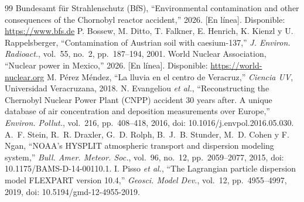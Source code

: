 \begin{thebibliography}{99}
 Bundesamt f\"ur Strahlenschutz (BfS), ``Environmental contamination and other consequences of the Chornobyl reactor accident,'' 2026. [En l\'inea]. Disponible: \url{https://www.bfs.de}
 P. Bossew, M. Ditto, T. Falkner, E. Henrich, K. Kienzl y U. Rappelsberger, ``Contamination of Austrian soil with caesium-137,'' \textit{J. Environ. Radioact.}, vol.~55, no.~2, pp.~187--194, 2001.
 World Nuclear Association, ``Nuclear power in Mexico,'' 2026. [En l\'inea]. Disponible: \url{https://world-nuclear.org}
 M. P\'erez M\'endez, ``La lluvia en el centro de Veracruz,'' \textit{Ciencia UV}, Universidad Veracruzana, 2018.
 N. Evangeliou \textit{et al.}, ``Reconstructing the Chernobyl Nuclear Power Plant (CNPP) accident 30 years after. A unique database of air concentration and deposition measurements over Europe,'' \textit{Environ. Pollut.}, vol.~216, pp.~408--418, 2016, doi: 10.1016/j.envpol.2016.05.030.
 A.~F. Stein, R.~R. Draxler, G.~D. Rolph, B.~J.~B. Stunder, M.~D. Cohen y F. Ngan, ``NOAA's HYSPLIT atmospheric transport and dispersion modeling system,'' \textit{Bull. Amer. Meteor. Soc.}, vol.~96, no.~12, pp.~2059--2077, 2015, doi: 10.1175/BAMS-D-14-00110.1.
 I. Pisso \textit{et al.}, ``The Lagrangian particle dispersion model FLEXPART version 10.4,'' \textit{Geosci. Model Dev.}, vol.~12, pp.~4955--4997, 2019, doi: 10.5194/gmd-12-4955-2019.
\end{thebibliography}
